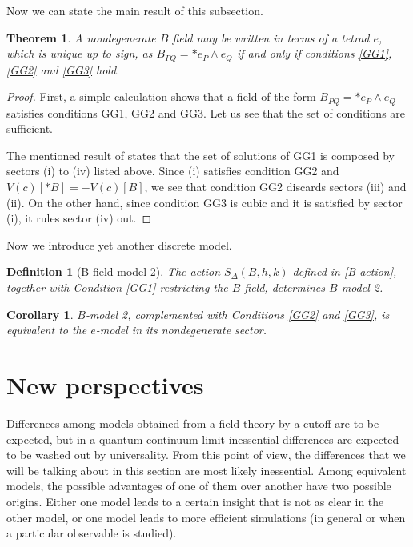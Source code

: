 \documentclass{article}
\newtheorem{theorem}{Theorem}
\newtheorem{corollary}{Corollary}
\newtheorem{definition}{Definition}
\begin{document}
Now we can state the main result of this subsection. 
\begin{theorem}\label{Thm2}
	A nondegenerate $B$ field may be written in terms of a tetrad $e$, which is unique up to sign, as 
	$B_{PQ} = \ast e_P \wedge e_Q$ 
	if and only if conditions \ref{GG1}, \ref{GG2} and \ref{GG3} hold. 
\end{theorem}

\begin{proof}
	First, a simple calculation shows that a field of the form $B_{PQ} = \ast e_P \wedge e_Q$ satisfies conditions GG1, GG2 and GG3. Let us see that the set of conditions are sufficient. 
	
	The mentioned result of \cite{FD} states that the set of solutions of GG1 is composed by sectors (i) to (iv) listed above. 
	Since (i) satisfies condition GG2 and $V(c)[\ast B] = - V(c)[B]$, we see that condition GG2 discards sectors (iii) and (ii). On the other hand, since condition GG3 is cubic and it is satisfied by sector (i), it rules sector (iv) out. 
%
\end{proof}


Now we introduce yet another discrete model. 
\begin{definition}[B-field model 2]
	The action $S_{\Delta}(B, h, k)$ defined in \eqref{B-action}, together with Condition \ref{GG1}  restricting the $B$ field, determines $B$-model 2. 
\end{definition}



\begin{corollary}\label{Cor2}
$B$-model 2, complemented with Conditions \ref{GG2} and \ref{GG3}, is equivalent to the $e$-model in its nondegenerate sector. 
\end{corollary}




\section{New perspectives}\label{NewPerspectives}


Differences among models obtained from a field theory by a cutoff are to be expected, but in a quantum continuum limit inessential differences are expected to be washed out by universality. From this point of view, the differences that we will be talking about in this section are most likely inessential. 
Among equivalent models, the possible advantages of one of them over another have two possible origins. Either one model leads to a certain insight that is not as clear in the other model, or one model leads to more efficient simulations (in general or when a particular observable is studied). 
\end{document}
